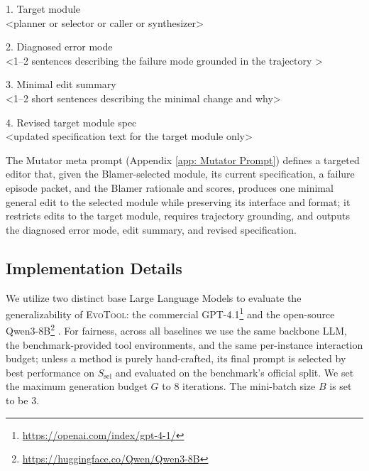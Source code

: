 \documentclass[11pt]{article}
\begin{document}
\begin{promptbox}
\vspace{0.5em}
1. Target module\\
\textless planner or selector or caller or synthesizer\textgreater

\vspace{0.5em}
2. Diagnosed error mode\\
\textless 1--2 sentences describing the failure mode grounded in the trajectory \textgreater

\vspace{0.5em}
3. Minimal edit summary\\
\textless 1--2 short sentences describing the minimal change and why\textgreater

\vspace{0.5em}
4. Revised target module spec\\
\textless updated specification text for the target module only\textgreater
\end{promptbox}



The Mutator meta prompt (Appendix \ref{app: Mutator Prompt}) defines a targeted editor that, given the Blamer-selected module, its current specification, a failure episode packet, and the Blamer rationale and scores, produces one minimal general edit to the selected module while preserving its interface and format; it restricts edits to the target module, requires trajectory grounding, and outputs the diagnosed error mode, edit summary, and revised specification.


\subsection{Implementation Details}
\label{app: implementation details}

We utilize two distinct base Large Language Models to evaluate the generalizability of \textsc{EvoTool}: the commercial GPT-4.1\footnote{\url{https://openai.com/index/gpt-4-1/}} \citep{openai2025gpt41} and the open-source Qwen3-8B\footnote{\url{https://huggingface.co/Qwen/Qwen3-8B}} \citep{yang2025qwen3}. For fairness, across all baselines we use the same backbone LLM, the benchmark-provided tool environments, and the same per-instance interaction budget; unless a method is purely hand-crafted, its final prompt is selected by best performance on $S_{\text{sel}}$ and evaluated on the benchmark’s official split. We set the maximum generation budget $G$ to 8 iterations. The mini-batch size $B$ is set to be 3.
\end{document}
